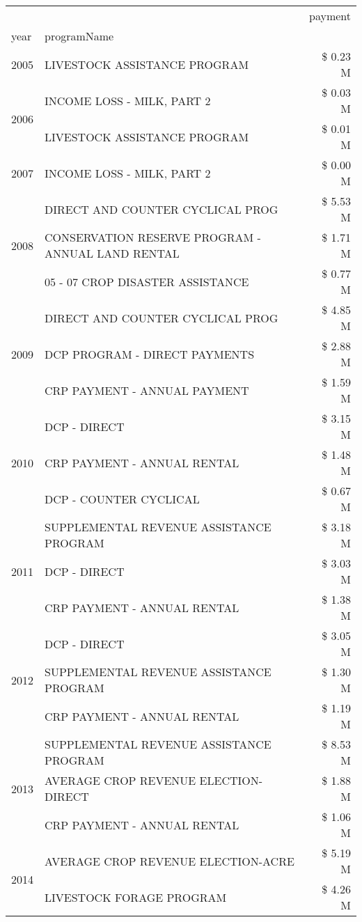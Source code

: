 \begin{tabular}{llr}
\toprule
 &  & payment \\
year & programName &  \\
\midrule
2005 & LIVESTOCK ASSISTANCE PROGRAM & \$ 0.23 M \\
\cline{1-3}
\multirow[t]{2}{*}{2006} & INCOME LOSS - MILK, PART 2 & \$ 0.03 M \\
 & LIVESTOCK ASSISTANCE PROGRAM & \$ 0.01 M \\
\cline{1-3}
2007 & INCOME LOSS - MILK, PART 2 & \$ 0.00 M \\
\cline{1-3}
\multirow[t]{3}{*}{2008} & DIRECT AND COUNTER CYCLICAL PROG & \$ 5.53 M \\
 & CONSERVATION RESERVE PROGRAM - ANNUAL LAND RENTAL & \$ 1.71 M \\
 & 05 - 07 CROP DISASTER ASSISTANCE & \$ 0.77 M \\
\cline{1-3}
\multirow[t]{3}{*}{2009} & DIRECT AND COUNTER CYCLICAL PROG & \$ 4.85 M \\
 & DCP PROGRAM - DIRECT PAYMENTS & \$ 2.88 M \\
 & CRP PAYMENT - ANNUAL PAYMENT & \$ 1.59 M \\
\cline{1-3}
\multirow[t]{3}{*}{2010} & DCP - DIRECT & \$ 3.15 M \\
 & CRP PAYMENT - ANNUAL RENTAL & \$ 1.48 M \\
 & DCP - COUNTER CYCLICAL & \$ 0.67 M \\
\cline{1-3}
\multirow[t]{3}{*}{2011} & SUPPLEMENTAL REVENUE ASSISTANCE PROGRAM & \$ 3.18 M \\
 & DCP - DIRECT & \$ 3.03 M \\
 & CRP PAYMENT - ANNUAL RENTAL & \$ 1.38 M \\
\cline{1-3}
\multirow[t]{3}{*}{2012} & DCP - DIRECT & \$ 3.05 M \\
 & SUPPLEMENTAL REVENUE ASSISTANCE PROGRAM & \$ 1.30 M \\
 & CRP PAYMENT - ANNUAL RENTAL & \$ 1.19 M \\
\cline{1-3}
\multirow[t]{3}{*}{2013} & SUPPLEMENTAL REVENUE ASSISTANCE PROGRAM & \$ 8.53 M \\
 & AVERAGE CROP REVENUE ELECTION-DIRECT & \$ 1.88 M \\
 & CRP PAYMENT - ANNUAL RENTAL & \$ 1.06 M \\
\cline{1-3}
\multirow[t]{3}{*}{2014} & AVERAGE CROP REVENUE ELECTION-ACRE & \$ 5.19 M \\
 & LIVESTOCK FORAGE PROGRAM & \$ 4.26 M \\

\end{tabular}

